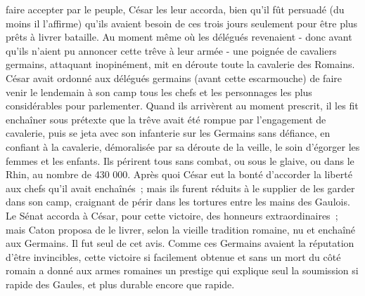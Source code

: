 \documentclass[french,twoside]{book} %
\begin{document}
faire accepter par le peuple, César les leur accor­da, bien qu'il fût persuadé (du moins il l'affirme) qu'ils avaient besoin de ces trois jours seulement pour être plus prêts à livrer bataille. Au moment même où les délégués revenaient - donc avant qu'ils n'aient pu annoncer cette trêve à leur armée - une poignée de cavaliers germains, attaquant inopinément, mit en déroute toute la cavalerie des Romains. César avait ordonné aux délégués germains (avant cette escarmouche) de faire venir le lendemain à son camp tous les chefs et les personnages les plus considérables pour parlementer. Quand ils arrivèrent au moment prescrit, il les fit enchaîner sous prétexte que la trêve avait été rompue par l'engagement de cavalerie, puis se jeta avec son infanterie sur les Germains sans défiance, en confiant à la cavalerie, démora­lisée par sa déroute de la veille, le soin d'égorger les femmes et les enfants. Ils périrent tous sans combat, ou sous le glaive, ou dans le Rhin, au nombre de 430 000. Après quoi César eut la bonté d'accorder la liberté aux chefs qu'il avait enchaînés ; mais ils furent réduits à le supplier de les garder dans son camp, craignant de périr dans les tortures entre les mains des Gaulois. Le Sénat accorda à César, pour cette victoire, des honneurs extraordinaires ; mais Caton proposa de le livrer, selon la vieille tradition romaine, nu et enchaîné aux Germains. Il fut seul de cet avis. Comme ces Germains avaient la réputa­tion d'être invincibles, cette victoire si facilement obtenue et sans un mort du côté romain a donné aux armes romaines un prestige qui explique seul la soumission si rapide des Gaules, et plus durable encore que rapide.\par
\end{document}
